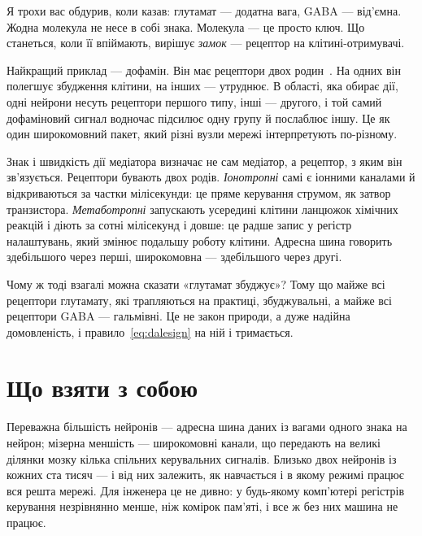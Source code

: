 Я трохи вас обдурив, коли казав: глутамат --- додатна вага, GABA --- від'ємна. Жодна молекула не несе в собі знака. Молекула --- це просто ключ. Що станеться, коли її впіймають, вирішує \emph{замок} --- рецептор на клітині-отримувачі.

Найкращий приклад --- дофамін. Він має рецептори двох родин~\cite{Beaulieu2011}. На одних він полегшує збудження клітини, на інших --- утруднює. В області, яка обирає дії, одні нейрони несуть рецептори першого типу, інші --- другого, і той самий дофаміновий сигнал водночас підсилює одну групу й послаблює іншу. Це як один широкомовний пакет, який різні вузли мережі інтерпретують по-різному.

\begin{keyblock}
\begin{proposition}
\label{prop:receptor}
Знак і швидкість дії медіатора визначає не сам медіатор, а рецептор, з яким він зв'язується. Рецептори бувають двох родів. \emph{Іонотропні} самі є іонними каналами й відкриваються за частки мілісекунди: це пряме керування струмом, як затвор транзистора. \emph{Метаботропні} запускають усередині клітини ланцюжок хімічних реакцій і діють за сотні мілісекунд і довше: це радше запис у регістр налаштувань, який змінює подальшу роботу клітини. Адресна шина говорить здебільшого через перші, широкомовна --- здебільшого через другі.
\end{proposition}
\end{keyblock}

Чому ж тоді взагалі можна сказати «глутамат збуджує»? Тому що майже всі рецептори глутамату, які трапляються на практиці, збуджувальні, а майже всі рецептори GABA --- гальмівні. Це не закон природи, а дуже надійна домовленість, і правило~\eqref{eq:dalesign} на ній і тримається.

\section{Що взяти з собою}

Переважна більшість нейронів --- адресна шина даних із вагами одного знака на нейрон; мізерна меншість --- широкомовні канали, що передають на великі ділянки мозку кілька спільних керувальних сигналів. Близько двох нейронів із кожних ста тисяч --- і від них залежить, як навчається і в якому режимі працює вся решта мережі. Для інженера це не дивно: у будь-якому комп'ютері регістрів керування незрівнянно менше, ніж комірок пам'яті, і все ж без них машина не працює.

